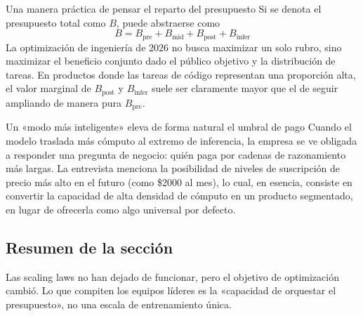\begin{knowledgebox}{Una manera práctica de pensar el reparto del presupuesto}
Si se denota el presupuesto total como $B$, puede abstraerse como
\[
B = B_{\text{pre}} + B_{\text{mid}} + B_{\text{post}} + B_{\text{infer}}
\]
La optimización de ingeniería de 2026 no busca maximizar un solo rubro, sino maximizar el beneficio conjunto dado el público objetivo y la distribución de tareas. En productos donde las tareas de código representan una proporción alta, el valor marginal de $B_{\text{post}}$ y $B_{\text{infer}}$ suele ser claramente mayor que el de seguir ampliando de manera pura $B_{\text{pre}}$.
\end{knowledgebox}

\begin{warningbox}{Un «modo más inteligente» eleva de forma natural el umbral de pago}
Cuando el modelo traslada más cómputo al extremo de inferencia, la empresa se ve obligada a responder una pregunta de negocio: quién paga por cadenas de razonamiento más largas. La entrevista menciona la posibilidad de niveles de suscripción de precio más alto en el futuro (como \$2000 al mes), lo cual, en esencia, consiste en convertir la capacidad de alta densidad de cómputo en un producto segmentado, en lugar de ofrecerla como algo universal por defecto.
\end{warningbox}

\subsection{Resumen de la sección}

Las scaling laws no han dejado de funcionar, pero el objetivo de optimización cambió. Lo que compiten los equipos líderes es la «capacidad de orquestar el presupuesto», no una escala de entrenamiento única.

